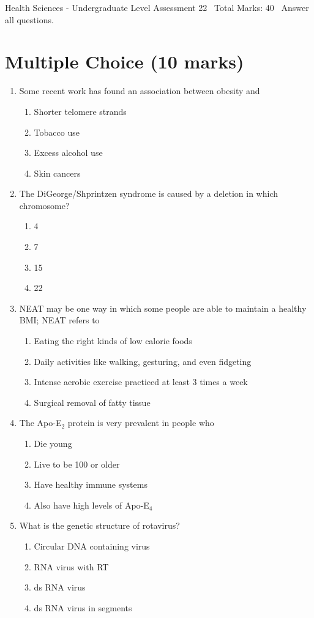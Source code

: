 \documentclass[12pt]{article}
\begin{document}
\begin{center}
Health Sciences - Undergraduate Level Assessment 22 \
Total Marks: 40 \
Answer all questions.
\end{center}

\section*{Multiple Choice (10 marks)}
\begin{enumerate}[label=\arabic*.]
\item Some recent work has found an association between obesity and
\begin{enumerate}[label=(\alph*)]
    \item Shorter telomere strands
    \item Tobacco use
    \item Excess alcohol use
    \item Skin cancers
\end{enumerate}
\item The DiGeorge/Shprintzen syndrome is caused by a deletion in which chromosome?
\begin{enumerate}[label=(\alph*)]
    \item 4
    \item 7
    \item 15
    \item 22
\end{enumerate}
\item NEAT may be one way in which some people are able to maintain a healthy BMI; NEAT refers to
\begin{enumerate}[label=(\alph*)]
    \item Eating the right kinds of low calorie foods
    \item Daily activities like walking, gesturing, and even fidgeting
    \item Intense aerobic exercise practiced at least 3 times a week
    \item Surgical removal of fatty tissue
\end{enumerate}
\item The Apo-E$_{2}$ protein is very prevalent in people who
\begin{enumerate}[label=(\alph*)]
    \item Die young
    \item Live to be 100 or older
    \item Have healthy immune systems
    \item Also have high levels of Apo-E$_{4}$
\end{enumerate}
\item What is the genetic structure of rotavirus?
\begin{enumerate}[label=(\alph*)]
    \item Circular DNA containing virus
    \item RNA virus with RT
    \item ds RNA virus
    \item ds RNA virus in segments
\end{enumerate}
\end{enumerate}
\end{document}
